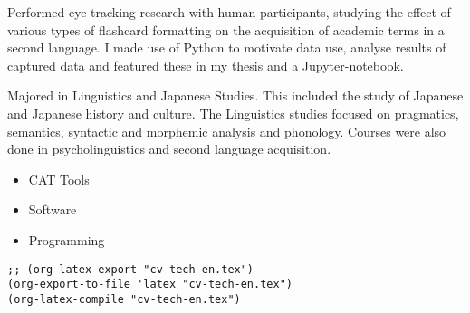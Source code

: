 \documentclass[10pt,a4paper,ragged2e,withhyper]{altacv}
\begin{document}
\begin{paracol}{2}
\label{sec:orgbe73bee}




{}
\label{sec:org0d832cb}
Performed eye-tracking research with human participants, studying the effect of
various types of flashcard formatting on the acquisition of academic terms in a
second language. I made use of Python to motivate data use, analyse results of captured data and featured these in my thesis and a Jupyter-notebook.
\par\divider
{}
Majored in Linguistics and Japanese Studies. This included the study of Japanese and Japanese history and culture. The Linguistics studies focused on pragmatics, semantics, syntactic and morphemic analysis and phonology. Courses were also done in psycholinguistics and second language acquisition.

\label{sec:org049ae0f}
\begin{itemize}
\item CAT Tools
\end{itemize}
\begin{itemize}
\item Software
\end{itemize}
\begin{itemize}
\item Programming
\end{itemize}

\cvtag{\LaTeX}

\end{paracol}

\label{sec:org31eaf5f}
\begin{verbatim}
;; (org-latex-export "cv-tech-en.tex")
(org-export-to-file 'latex "cv-tech-en.tex")
(org-latex-compile "cv-tech-en.tex")
\end{verbatim}
\end{document}
